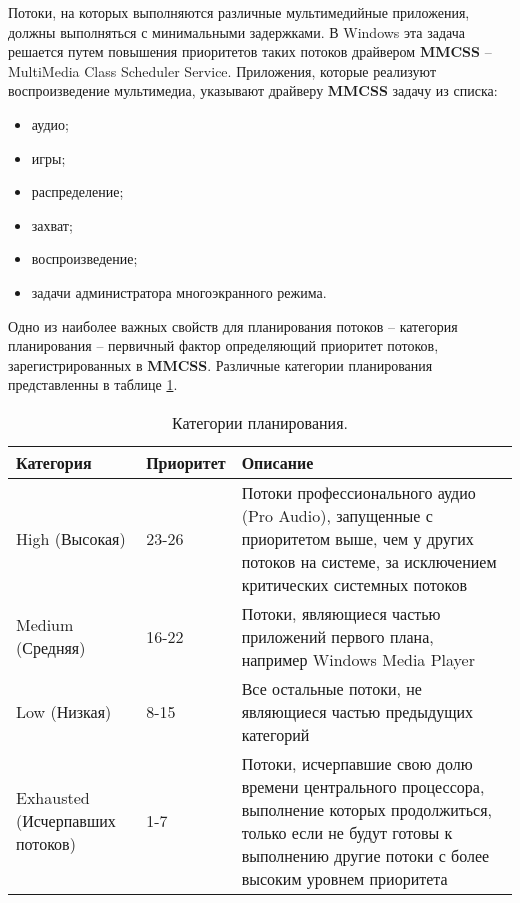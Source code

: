 Потоки, на которых выполняются различные мультимедийные приложения, должны выполняться с минимальными задержками. В Windows эта задача решается путем повышения приоритетов таких потоков драйвером \textbf{MMCSS} -- MultiMedia Class Scheduler Service. Приложения, которые реализуют воспроизведение мультимедиа, указывают драйверу \textbf{MMCSS} задачу из списка:

\begin{itemize}
	\item аудио;
	\item игры;
	\item распределение;
	\item захват;
	\item воспроизведение;
	\item задачи администратора многоэкранного режима.
\end{itemize}

Одно из наиболее важных свойств для планирования потоков -- категория планирования -- первичный фактор определяющий приоритет потоков, зарегистрированных в \textbf{MMCSS}. Различные категории планирования представленны в таблице \ref{tab:plan}.

\begin{table}[h]
	\caption{Категории планирования.}
	\begin{center}
		\begin{tabular}{|p{40mm}|p{30mm}|p{80mm}|}
			\hline
			\textbf{Категория} & \textbf{Приоритет} & \textbf{Описание} \\
			\hline
			High (Высокая) & 23-26 & Потоки профессионального аудио (Pro Audio), запущенные с приоритетом выше, чем у других потоков на системе, за исключением критических системных потоков \\
			\hline
			Medium (Средняя) & 16-22 & Потоки, являющиеся частью приложений первого плана, например Windows Media Player \\
			\hline
			Low (Низкая) & 8-15 & Все остальные потоки, не являющиеся частью предыдущих категорий \\
			\hline
			Exhausted (Исчерпавших потоков) & 1-7 & Потоки, исчерпавшие свою долю времени центрального процессора, выполнение которых продолжиться, только если не будут готовы к выполнению другие потоки с более высоким уровнем приоритета \\
			\hline
		\end{tabular}
	\end{center}
	\label{tab:plan}
\end{table}

